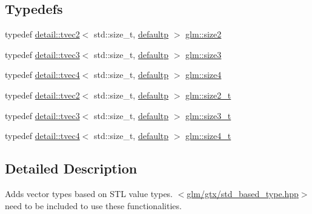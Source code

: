 \subsection*{Typedefs}
\begin{DoxyCompactItemize}
\item 
typedef \hyperlink{structglm_1_1detail_1_1tvec2}{detail\+::tvec2}$<$ std\+::size\+\_\+t, \hyperlink{namespaceglm_a0f04f086094c747d227af4425893f545a9d21ccd8b5a009ec7eb7677befc3bf51}{defaultp} $>$ \hyperlink{group__gtx__std__based__type_ga393e8beba20ea33452384087a2864f86}{glm\+::size2}
\item 
typedef \hyperlink{structglm_1_1detail_1_1tvec3}{detail\+::tvec3}$<$ std\+::size\+\_\+t, \hyperlink{namespaceglm_a0f04f086094c747d227af4425893f545a9d21ccd8b5a009ec7eb7677befc3bf51}{defaultp} $>$ \hyperlink{group__gtx__std__based__type_gae1dda4cdccd4c1abeeb2e470c048d0c9}{glm\+::size3}
\item 
typedef \hyperlink{structglm_1_1detail_1_1tvec4}{detail\+::tvec4}$<$ std\+::size\+\_\+t, \hyperlink{namespaceglm_a0f04f086094c747d227af4425893f545a9d21ccd8b5a009ec7eb7677befc3bf51}{defaultp} $>$ \hyperlink{group__gtx__std__based__type_gac04a40cfe44b5035770cf26d98a9349d}{glm\+::size4}
\item 
typedef \hyperlink{structglm_1_1detail_1_1tvec2}{detail\+::tvec2}$<$ std\+::size\+\_\+t, \hyperlink{namespaceglm_a0f04f086094c747d227af4425893f545a9d21ccd8b5a009ec7eb7677befc3bf51}{defaultp} $>$ \hyperlink{group__gtx__std__based__type_ga64be170f9203528ff59efa40b1977bb0}{glm\+::size2\+\_\+t}
\item 
typedef \hyperlink{structglm_1_1detail_1_1tvec3}{detail\+::tvec3}$<$ std\+::size\+\_\+t, \hyperlink{namespaceglm_a0f04f086094c747d227af4425893f545a9d21ccd8b5a009ec7eb7677befc3bf51}{defaultp} $>$ \hyperlink{group__gtx__std__based__type_gad9ddaab6dd4c37ba46b74a1423ef2ba3}{glm\+::size3\+\_\+t}
\item 
typedef \hyperlink{structglm_1_1detail_1_1tvec4}{detail\+::tvec4}$<$ std\+::size\+\_\+t, \hyperlink{namespaceglm_a0f04f086094c747d227af4425893f545a9d21ccd8b5a009ec7eb7677befc3bf51}{defaultp} $>$ \hyperlink{group__gtx__std__based__type_gaaaf9b6a73135945e356601a01beece30}{glm\+::size4\+\_\+t}
\end{DoxyCompactItemize}


\subsection{Detailed Description}
Adds vector types based on S\+TL value types. $<$\hyperlink{std__based__type_8hpp}{glm/gtx/std\+\_\+based\+\_\+type.\+hpp}$>$ need to be included to use these functionalities. 



